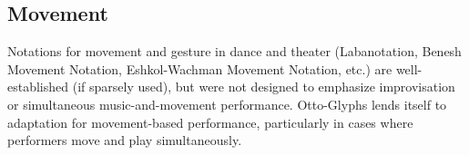 \documentclass[twoside, 11pt]{book}
\begin{document}
    \subsection{Movement}
    Notations for movement and gesture in dance and theater (Labanotation, Benesh Movement Notation, Eshkol-Wachman Movement Notation, etc.) are well-established (if sparsely used), but were not designed to emphasize improvisation or simultaneous music-and-movement performance. Otto-Glyphs lends itself to adaptation for movement-based performance, particularly in cases where performers move and play simultaneously.




\clearpage


\printglossary

% 
% 
\end{document}
